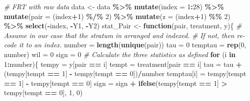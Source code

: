 \documentclass[]{article}
\newenvironment{Shaded}{\begin{snugshade}}{\end{snugshade}}
\newcommand{\KeywordTok}[1]{\textcolor[rgb]{0.13,0.29,0.53}{\textbf{#1}}}
\newcommand{\DataTypeTok}[1]{\textcolor[rgb]{0.13,0.29,0.53}{#1}}
\newcommand{\DecValTok}[1]{\textcolor[rgb]{0.00,0.00,0.81}{#1}}
\newcommand{\StringTok}[1]{\textcolor[rgb]{0.31,0.60,0.02}{#1}}
\newcommand{\CommentTok}[1]{\textcolor[rgb]{0.56,0.35,0.01}{\textit{#1}}}
\newcommand{\ControlFlowTok}[1]{\textcolor[rgb]{0.13,0.29,0.53}{\textbf{#1}}}
\newcommand{\OperatorTok}[1]{\textcolor[rgb]{0.81,0.36,0.00}{\textbf{#1}}}
\newcommand{\NormalTok}[1]{#1}
\begin{document}
\begin{Shaded}
\begin{Highlighting}[]
\CommentTok{# FRT with raw data}
\NormalTok{data <-}\StringTok{ }\NormalTok{data }\OperatorTok{\%>\%}
\StringTok{  }\KeywordTok{mutate}\NormalTok{(}\DataTypeTok{index =} \DecValTok{1}\OperatorTok{:}\DecValTok{28}\NormalTok{) }\OperatorTok{\%>\%}
\StringTok{  }\KeywordTok{mutate}\NormalTok{(}\DataTypeTok{pair =}\NormalTok{ (index}\OperatorTok{+}\DecValTok{1}\NormalTok{) }\OperatorTok{\%/\%}\StringTok{ }\DecValTok{2}\NormalTok{) }\OperatorTok{\%>\%}
\StringTok{  }\KeywordTok{mutate}\NormalTok{(}\DataTypeTok{z =}\NormalTok{ (index}\OperatorTok{+}\DecValTok{1}\NormalTok{) }\OperatorTok{\%\%}\StringTok{ }\DecValTok{2}\NormalTok{) }\OperatorTok{\%>\%}
\StringTok{  }\KeywordTok{select}\NormalTok{(}\OperatorTok{-}\NormalTok{index, }\OperatorTok{-}\NormalTok{Y1, }\OperatorTok{-}\NormalTok{Y2)}
\NormalTok{stat_Pair <-}\StringTok{ }\ControlFlowTok{function}\NormalTok{(pair, treatment, y)\{}
  \CommentTok{# Assume in our case that the stratum in arranged and indexed.}
  \CommentTok{# If not, then re-code it to an index.}
\NormalTok{  number =}\StringTok{ }\KeywordTok{length}\NormalTok{(}\KeywordTok{unique}\NormalTok{(pair))}
\NormalTok{  tau =}\StringTok{ }\DecValTok{0}
\NormalTok{  temptau =}\StringTok{ }\KeywordTok{rep}\NormalTok{(}\DecValTok{0}\NormalTok{, number)}
\NormalTok{  wil =}\StringTok{ }\DecValTok{0}
\NormalTok{  sign =}\StringTok{ }\DecValTok{0}
  \CommentTok{# Calculate the three statistics as defined}
  \ControlFlowTok{for}\NormalTok{ (i }\ControlFlowTok{in} \DecValTok{1}\OperatorTok{:}\NormalTok{number)\{}
\NormalTok{    tempy =}\StringTok{ }\NormalTok{y[pair }\OperatorTok{==}\StringTok{ }\NormalTok{i]}
\NormalTok{    tempt =}\StringTok{ }\NormalTok{treatment[pair }\OperatorTok{==}\StringTok{ }\NormalTok{i]}
\NormalTok{    tau =}\StringTok{ }\NormalTok{tau }\OperatorTok{+}\StringTok{ }\NormalTok{(tempy[tempt }\OperatorTok{==}\StringTok{ }\DecValTok{1}\NormalTok{] }\OperatorTok{-}\StringTok{ }\NormalTok{tempy[tempt }\OperatorTok{==}\StringTok{ }\DecValTok{0}\NormalTok{])}\OperatorTok{/}\NormalTok{number}
\NormalTok{    temptau[i] =}\StringTok{ }\NormalTok{tempy[tempt }\OperatorTok{==}\StringTok{ }\DecValTok{1}\NormalTok{] }\OperatorTok{-}\StringTok{ }\NormalTok{tempy[tempt }\OperatorTok{==}\StringTok{ }\DecValTok{0}\NormalTok{]}
\NormalTok{    sign =}\StringTok{ }\NormalTok{sign }\OperatorTok{+}\StringTok{ }\KeywordTok{ifelse}\NormalTok{(tempy[tempt }\OperatorTok{==}\StringTok{ }\DecValTok{1}\NormalTok{] }\OperatorTok{>}\StringTok{ }\NormalTok{tempy[tempt }\OperatorTok{==}\StringTok{ }\DecValTok{0}\NormalTok{], }\DecValTok{1}\NormalTok{, }\DecValTok{0}\NormalTok{)}

\end{Highlighting}
\end{Shaded}
\end{document}

